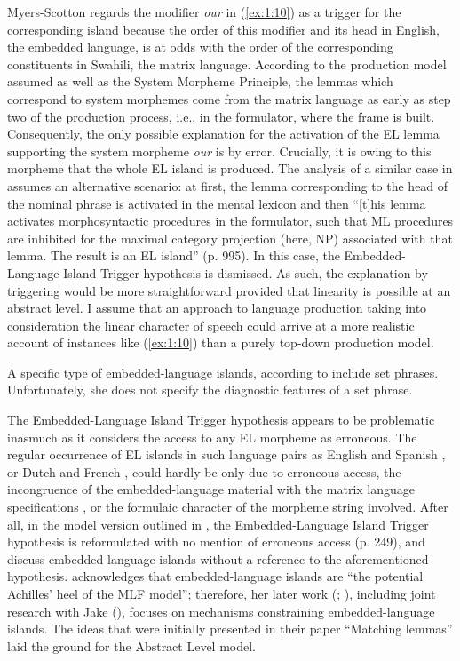 \noindent Myers-Scotton regards the modifier \textit{our} in (\ref{ex:1:10}) as a trigger for the corresponding island because the order of this modifier and its head in English, the embedded language, is at odds with the order of the corresponding constituents in Swahili, the matrix language. According to the production model assumed as well as the System Morpheme Principle, the lemmas which correspond to system morphemes come from the matrix language as early as step two of the production process, i.e., in the formulator, where the frame is built. Consequently, the only possible explanation for the activation of the EL lemma supporting the system morpheme \textit{our} is by error. Crucially, it is owing to this morpheme that the whole EL island is produced. The analysis of a similar case in \citet{myers-scotton-matching-1995} assumes an alternative scenario: at first, the lemma corresponding to the head of the nominal phrase is activated in the mental lexicon and then ``[t]his lemma activates morphosyntactic procedures in the formulator, such that ML procedures are inhibited for the maximal category projection (here, NP) associated with that lemma. The result is an EL island''  (p. 995). In this case, the Embedded-Language Island Trigger hypothesis is dismissed. As such, the explanation by triggering would be more straightforward provided that linearity is possible at an abstract level. I assume that an approach to language production taking into consideration the linear character of speech could arrive at a more realistic account of instances like (\ref{ex:1:10}) than a purely top-down production model.

A specific type of embedded-language islands, according to \citet[142, 144]{myers-scotton-duelling-1993} include set phrases. Unfortunately, she does not specify the diagnostic features of a set phrase.

The Embedded-Language Island Trigger hypothesis appears to be problematic inasmuch as it considers the access to any EL morpheme as erroneous. The regular occurrence of EL islands in such language pairs as English and Spanish \citep[cf.][]{poplack-sometimes-1980}, or Dutch and French \citep[cf.][]{treffers-daller-mixing-1994}, could hardly be only due to erroneous access, the incongruence of the embedded-language material with the matrix language specifications \citep[250]{milroy-lexically-1995}, or the formulaic character of the morpheme string involved. After all, in the model version outlined in \citet{milroy-lexically-1995}, the Embedded-Language Island Trigger hypothesis is reformulated with no mention of erroneous access (p. 249), and  \citet{myers-scotton-matching-1995} discuss embedded-language islands without a reference to the aforementioned hypothesis. \citet[137]{myers-scotton-duelling-1993} acknowledges that embedded-language islands are ``the potential Achilles' heel of the MLF model''; therefore, her later work (\citeyear{myers-scotton-matrix-2001}; \citeyear{myers-scotton-contact-2002}), including joint research with Jake (\citeyear{myers-scotton-matching-1995}), focuses on mechanisms constraining embedded-language islands. The ideas that were initially presented in their \citeyear{myers-scotton-matching-1995} paper ``Matching lemmas'' laid the ground for the Abstract Level model.

